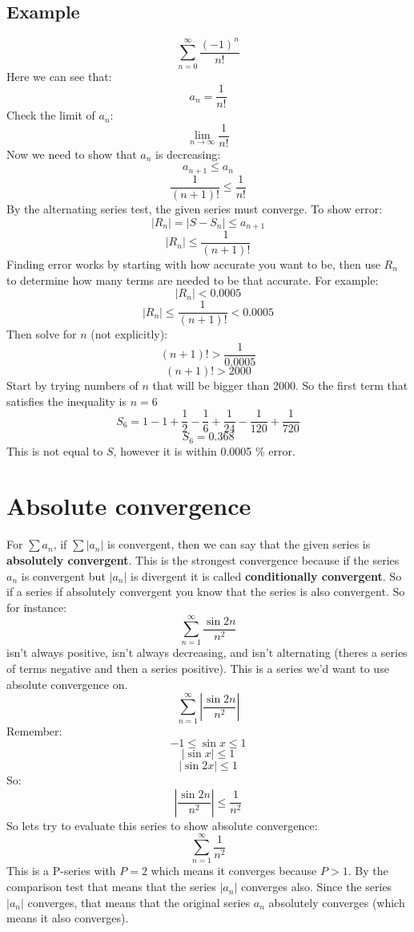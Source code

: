 \documentclass{article}
\begin{document}
    \subsection{Example}
        \[\sum_{n = 0}^{\infty} \frac{(-1)^n}{n!}\]
        Here we can see that:
        \[a_n = \frac{1}{n!}\]
        Check the limit of \(a_n\):
        \[\lim_{n \to \infty} \frac{1}{n!} \]
        Now we need to show that \(a_n\) is decreasing:
        \[a_{n+1} \leq a_n\]
        \[\frac{1}{(n+1)!} \leq \frac{1}{n!}\]
        By the alternating series test, the given series must converge. To show error:
        \[|R_n| = |S - S_n| \leq a_{n+1}\]
        \[|R_n| \leq \frac{1}{(n+1)!}\]
        Finding error works by starting with how accurate you want to be, then use \(R_n\) to determine how many terms are needed to be that accurate. For example:
        \[|R_n| < 0.0005\]
        \[|R_n| \leq \frac{1}{(n+1)!} < 0.0005\]
        Then solve for \(n\) (not explicitly):
        \[(n+1)! > \frac{1}{0.0005}\]
        \[(n+1)! > 2000\]
        Start by trying numbers of \(n\) that will be bigger than 2000. So the first term that satisfies the inequality is \(n = 6\)
        \[S_6 = 1 - 1 + \frac{1}{2} - \frac{1}{6} + \frac{1}{24} - \frac{1}{120}+ \frac{1}{720}\]
        \[S_6 = 0.368\]
        This is not equal to \(S\), however it is within 0.0005 \% error.

\section{Absolute convergence}
    For \(\sum a_n\), if \(\sum |a_n|\) is convergent, then we can say that the given series is \textbf{absolutely convergent}. This is the strongest convergence because
    if the series \(a_n\) is convergent but \(|a_n|\) is divergent it is called \textbf{conditionally convergent}. So if a series if absolutely convergent
    you know that the series is also convergent.
    So for instance:
    \[\sum_{n = 1}^{\infty} \frac{\sin 2n}{n^2}\]
    isn't always positive, isn't always decreasing, and isn't alternating (theres a series of terms negative and then a series positive).
    This is a series we'd want to use absolute convergence on.
    \[\sum_{n = 1}^{\infty} \left| \frac{\sin 2n}{n^2} \right|\]
    Remember:
    \[-1 \leq \sin x \leq 1\]
    \[| \sin x | \leq 1\]
    \[| \sin 2x | \leq 1\]
    So:
    \[\left| \frac{\sin 2n}{n^2} \right| \leq \frac{1}{n^2}\] 
    So lets try to evaluate this series to show absolute convergence:
    \[\sum_{n = 1}^{\infty} \frac{1}{n^2} \]
    This is a P-series with \(P = 2\) which means it converges because \(P > 1\).
    By the comparison test that means that the series \(|a_n|\) converges also.
    Since the series \(|a_n|\) converges, that means that the original series \(a_n\) absolutely converges (which means it also converges).
    
\end{document}
